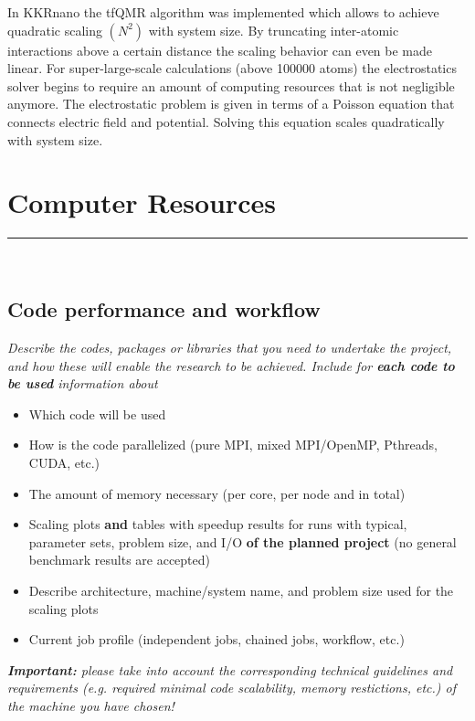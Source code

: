 \documentclass [a4paper, 12pt]{article}
\begin{document}
In KKRnano the tfQMR algorithm \cite{freund_qmr:_1991} was implemented which allows to
achieve quadratic scaling $(N^2)$ with system size. By truncating inter-atomic
interactions above a certain distance the scaling behavior can even be made linear.
For super-large-scale calculations (above 100000 atoms) the electrostatics solver begins
to require an amount of computing resources that is not negligible anymore. 
The electrostatic problem is given in terms of a Poisson equation that connects electric field and potential. 
Solving this equation scales quadratically with system size. 


\section{Computer Resources}
\rule{\textwidth}{0.4pt}\\
\subsection{Code performance and workflow}
\textit{Describe the codes, packages or libraries that you need to undertake the project, and how these will enable the research to be achieved. Include for \textbf{each code to be used} information about}
\begin{itshape}
\begin{itemize}\setlength{\itemsep}{-2pt}
  \item Which code will be used
  \item How is the code parallelized (pure MPI, mixed MPI/OpenMP, Pthreads, CUDA, etc.)
  \item The amount of memory necessary (per core, per node and in total)
  \item Scaling plots \textbf{and} tables with speedup results for runs with typical, parameter sets, problem size, and I/O \textbf{of the planned project} (no general benchmark results are accepted)
  \item Describe architecture, machine/system name, and problem size used for the scaling plots
  \item Current job profile (independent jobs, chained jobs, workflow, etc.)
\end{itemize}
\end{itshape}

{\it \textbf{Important:} please take into account the corresponding technical guidelines and requirements (e.g. required minimal code scalability, memory restictions, etc.) of the machine you have chosen!}\\
\end{document}
